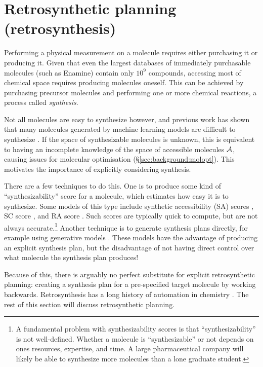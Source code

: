 \section{Retrosynthetic planning (retrosynthesis)}
\label{sec:background:synthesis}

Performing a physical measurement on a molecule requires either purchasing it or producing it.
Given that even the largest databases of immediately purchasable molecules (such as Enamine) contain only $10^9$ compounds,
accessing most of chemical space requires producing molecules oneself.
This can be achieved by purchasing precursor molecules and performing one or more chemical reactions,
a process called \emph{synthesis}.

Not all molecules are easy to synthesize however, and previous work has shown that many molecules generated
by machine learning models are difficult to synthesize
\citep{gao2020synthesizability}.
If the space of synthesizable molecules is unknown,
this is equivalent to having an incomplete knowledge of
the space of accessible molecules $\mathcal{A}$,
causing issues for molecular optimisation (\S\ref{sec:background:molopt}).
This motivates the importance of explicitly considering synthesis.

There are a few techniques to do this.
One is to produce some kind of ``synthesizability''
score for a molecule, which estimates how easy it is to synthesize.
Some models of this type include synthetic accessibility (SA) scores
\citep{ertl2009estimation},
SC score \citep{coley2018scscore},
and RA score \citep{thakkar2021retrosynthetic}.
Such scores are typically quick to compute,
but are not always accurate.\footnote{
    A fundamental problem with synthesizability scores
    is that ``synthesizability'' is not well-defined.
    Whether a molecule is ``synthesizable'' or not depends on
    ones resources, expertise, and time.
    A large pharmaceutical company will likely be able to synthesize
    more molecules than a lone graduate student.
}
Another technique is to generate synthesis plans directly,
for example using generative models
\citep{bradshaw2019model,bradshaw2020barking,gottipati2020learning,gao2021amortized}.
These models have the advantage of producing an explicit synthesis plan,
but the disadvantage of not having direct control over what molecule the synthesis plan produces!

Because of this, there is arguably no perfect substitute for explicit retrosynthetic planning:
creating a synthesis plan for a pre-specified target molecule by working backwards.
Retrosynthesis has a long history of automation in chemistry
\citep{vleduts1963concerning,corey1969computer}.
The rest of this section will discuss retrosynthetic planning.

